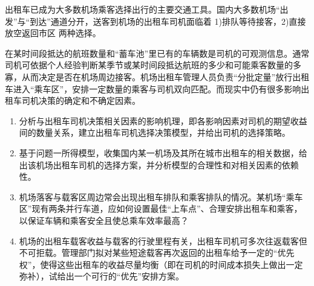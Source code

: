 出租车已成为大多数机场乘客选择出行的主要交通工具。国内大多数机场``出发''与``到达''通道分开，送客到机场的出租车司机面临着 1)排队等待接客，2)直接放空返回市区 两种选择。

在某时间段抵达的航班数量和``蓄车池''里已有的车辆数是司机的可观测信息。通常司机可依据个人经验判断某季节或某时间段抵达航班的多少和可能乘客数量的多寡，从而决定是否在机场周边接客。机场出租车管理人员负责``分批定量''放行出租车进入``乘车区''，安排一定数量的乘客与司机双向匹配。而现实中仍有很多影响出租车司机决策的确定和不确定因素。

\begin{enumerate}[label=(\arabic*)]
    \item 分析与出租车司机决策相关因素的影响机理，即各影响因素对司机的期望收益间的数量关系，建立出租车司机选择决策模型，并给出司机的选择策略。
    \item 基于问题一所得模型，收集国内某一机场及其所在城市出租车的相关数据，给出该机场出租车司机的选择方案，并分析模型的合理性和对相关因素的依赖性。
    \item 机场落客与载客区周边常会出现出租车排队和乘客排队的情况。某机场``乘车区''现有两条并行车道，应如何设置最佳``上车点''、合理安排出租车和乘客，以保证车辆和乘客安全且使总乘车效率最高？
    \item 机场的出租车载客收益与载客的行驶里程有关，出租车司机可多次往返载客但不可拒载。管理部门拟对某些短途载客再次返回的出租车给予一定的``优先权''，使得这些出租车的收益尽量均衡（即在司机的时间成本损失上做出一定弥补），试给出一个可行的``优先''安排方案。
\end{enumerate}
